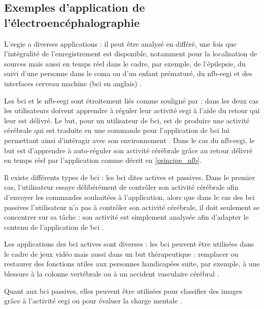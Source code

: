 \subsection{Exemples d'application de l'électroencéphalographie}

L'\gls{eegie} a diverses applications : il peut être analysé en différé, une fois que l'intégralité de l'enregistrement est disponible, notamment pour la localisation de sources \citep{Latif2006} 
mais aussi en temps réel dans le cadre, par exemple, de l'épilepsie, du suivi d'une personne dans 
le coma ou d'un enfant prématuré, du \gls{nfb}-\gls{eegi} et des interfaces cerveau machine (\gls{bci} en anglais) \citep{Li2010}. 

Les \gls{bci} et le \gls{nfb}-\gls{eegi} sont étroitement liés comme souligné par \citet{Jeunet2018} : dans les deux cas les utilisateurs doivent apprendre à réguler leur activité \gls{eegi} à l'aide du retour 
qui leur est délivré. Le but, pour un utilisateur de \gls{bci}, est de produire une activité cérébrale qui est traduite en une commande pour l'application de \gls{bci} lui permettant ainsi d'intéragir 
avec son environnement \citep{Enriquez2017, Birbaumer2009}. Dans le cas du \gls{nfb}-\gls{eegi}, le but est d'apprendre à auto-réguler son activité cérébrale grâce au retour délivré en temps réel par l'application 
\citep{Enriquez2017, Jeunet2018} comme décrit en \ref{principe_nfb}.

Il existe différents types de \gls{bci} : les \gls{bci} dites actives et passives. Dans le premier cas, l'utilisateur essaye délibérément de contrôler son activité cérébrale afin
d'envoyer les commandes souhaitées à l'application, alors que dans le cas des \gls{bci} passives l'utilisateur n'a pas à contrôler son activité cérébrale, il doit seulement
se concentrer sur sa tâche : son activité est simplement analysée afin d'adapter le contenu de l'application de \gls{bci} \citep{George2014}. 

Les applications des \gls{bci} actives sont diverses : les \gls{bci} peuvent être utilisées dans le cadre de jeux vidéo \citep{Kerous2018} mais aussi dans un but thérapeutique : remplacer ou
restaurer des fonctions utiles aux personnes handicapées suite, par exemple, à une blessure à la colonne vertébrale ou à un accident vasculaire cérébral \citep{Shih2012}. 

Quant aux \gls{bci} passives, elles peuvent être utilisées pour classifier des images grâce à l'activité \gls{eegi} ou pour évaluer la charge mentale \citep{George2014}.   


